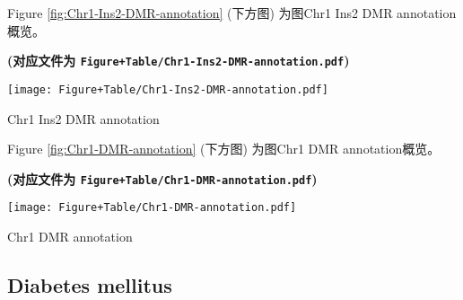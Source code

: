 \documentclass[
]{article}
\begin{document}
\begin{center}\vspace{1.5cm}\end{center}

Figure \ref{fig:Chr1-Ins2-DMR-annotation} (下方图) 为图Chr1 Ins2 DMR annotation概览。

\textbf{(对应文件为 \texttt{Figure+Table/Chr1-Ins2-DMR-annotation.pdf})}

\def\@captype{figure}
\begin{center}
\texttt{[image: Figure+Table/Chr1-Ins2-DMR-annotation.pdf]}
\caption{Chr1 Ins2 DMR annotation}\label{fig:Chr1-Ins2-DMR-annotation}
\end{center}

\begin{center}\vspace{1.5cm}\end{center}

\begin{center}\vspace{1.5cm}\end{center}

Figure \ref{fig:Chr1-DMR-annotation} (下方图) 为图Chr1 DMR annotation概览。

\textbf{(对应文件为 \texttt{Figure+Table/Chr1-DMR-annotation.pdf})}

\def\@captype{figure}
\begin{center}
\texttt{[image: Figure+Table/Chr1-DMR-annotation.pdf]}
\caption{Chr1 DMR annotation}\label{fig:Chr1-DMR-annotation}
\end{center}

\begin{center}\vspace{1.5cm}\end{center}

\hypertarget{diabetes-mellitus}{%
\subsection{Diabetes mellitus}\label{diabetes-mellitus}}

\begin{center}\vspace{1.5cm}\end{center}
\end{document}
